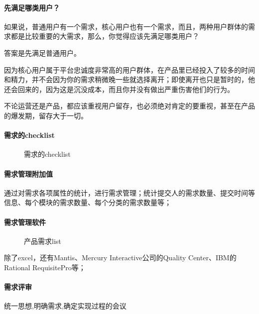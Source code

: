 \documentclass[letterpaper,11pt,english]{sphinxmanual}
\begin{document}
\paragraph{先满足哪类用户？}
\label{\detokenize{chapter_introduction/need:id10}}
如果说，普通用户有一个需求，核心用户也有一个需求，而且，两种用户群体的需求都是比较重要的大需求，那么，你觉得应该先满足哪类用户？

答案是先满足普通用户。

因为核心用户属于平台忠诚度非常高的用户群体，在产品里已经投入了较多的时间和精力，并不会因为你的需求稍微晚一些就选择离开；即使离开也只是暂时的，他还会回来的，因为这是沉没成本，而且你并没有做出严重伤害他们的行为。

不论运营还是产品，都应该重视用户留存，也必须绝对肯定的要重视，甚至在产品的爆发期，留存大于一切。


\paragraph{需求的checklist}
\label{\detokenize{chapter_introduction/need:checklist}}
\begin{figure}[H]
\centering
\capstart

\noindent{}
\caption{需求的checklist}\label{\detokenize{chapter_introduction/need:id18}}\end{figure}


\paragraph{需求管理附加值}
\label{\detokenize{chapter_introduction/need:id11}}
通过对需求各项属性的统计，进行需求管理；统计提交人的需求数量、提交时间等信息、每个模块的需求数量、每个分类的需求数量等；


\paragraph{需求管理软件}
\label{\detokenize{chapter_introduction/need:id12}}
\begin{figure}[H]
\centering
\capstart

\noindent{}
\caption{产品需求list}\label{\detokenize{chapter_introduction/need:id19}}\end{figure}

除了excel，还有Mantis、Mercury Interactive公司的Quality
Center、IBM的Rational RequisitePro等；


\paragraph{需求评审}
\label{\detokenize{chapter_introduction/need:id13}}
统一思想,明确需求,确定实现过程的会议
\end{document}

